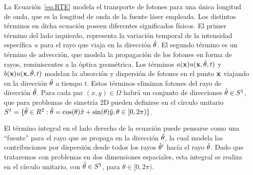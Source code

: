 La Ecuación~\eqref{eq:RTE} 
modela el transporte de fotones para una única longitud de onda, que es la longitud 
de onda de la fuente láser empleada.
Los distintos términos en dicha ecuación poseen 
diferentes significados físicos. El primer término del lado izquierdo, representa la variación temporal  
de la intensidad específica $u$ para el rayo que viaja en la dirección $\hat{\theta}$. 
El segundo término es un término de advección, que modela la propagación de 
los fotones en forma de rayos, reminiscentes a la óptica geométrica. Los términos $a(\mathbf{x})u(\mathbf{x},\hat{\theta},t)$ y $b(\mathbf{x})u(\mathbf{x},\hat{\theta},t)$ modelan la 
absorción y dispersión de fotones 
en el punto $\mathbf{x}$ viajando en la dirección $\hat{\theta}$ a tiempo $t$. Estos términos eliminan 
fotones del rayo de dirección $\hat{\theta}$. 
Para cada par $(x,y)\in \Omega$ habrá un conjunto de direcciones $\hat{\theta} \in S^1$, 
que para problemas de simetría 2D 
pueden definirse en el círculo unitario $S^1=\{ \hat{\theta} \in R^2: 
\hat{\theta}=\cos(\theta)\hat x+\sin(\theta) \hat y, \theta \in [0,2\pi)  \}$. 

El término integral en el lado derecho de la ecuación 
puede pensarse como una ``fuente'' para el rayo que se propaga en la dirección $\hat{\theta}$, 
la cual modela las contribuciones por dispersión desde todos los rayos $\hat{\theta}'$ 
hacía el rayo $\hat{\theta}$. Dado que trataremos con problemas en dos dimensiones espaciales, 
esta integral se realiza en el círculo unitario, con $\hat{\theta} \in S^1$, 
para $\theta \in [0,2\pi)$.

